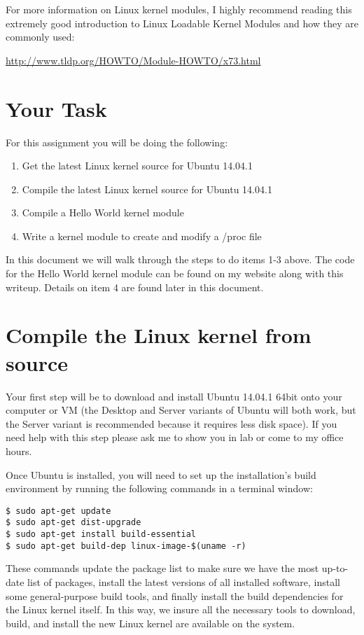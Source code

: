 \documentclass[11pt]{article}
\begin{document}
For more information on Linux kernel modules, I highly recommend reading this extremely good introduction to Linux Loadable Kernel Modules and how they are commonly used:

{\url{http://www.tldp.org/HOWTO/Module-HOWTO/x73.html}}


\section*{Your Task}

For this assignment you will be doing the following:

\begin{enumerate}
\item{Get the latest Linux kernel source for Ubuntu 14.04.1}
\item{Compile the latest Linux kernel source for Ubuntu 14.04.1}
\item{Compile a Hello World kernel module}
\item{Write a kernel module to create and modify a /proc file}
\end{enumerate}

In this document we will walk through the steps to do items 1-3 above. The code for the Hello World kernel module can be found on my website along with this writeup. Details on item 4 are found later in this document. 



\section*{Compile the Linux kernel from source}
Your first step will be to download and install Ubuntu 14.04.1 64bit \cite{ubuntuserver} onto your computer or VM (the Desktop and Server variants of Ubuntu will both work, but the Server variant is recommended because it requires less disk space). If you need help with this step please ask me to show you in lab or come to my office hours.

Once Ubuntu is installed, you will need to set up the installation's build environment by running the following commands in a terminal window:

\begin{verbatim}
$ sudo apt-get update
$ sudo apt-get dist-upgrade
$ sudo apt-get install build-essential
$ sudo apt-get build-dep linux-image-$(uname -r)
\end{verbatim}

These commands update the package list to make sure we have the most up-to-date list of packages, install the latest versions of all installed software, install some general-purpose build tools, and finally install the build dependencies for the Linux kernel itself. In this way, we insure all the necessary tools to download, build, and install the new Linux kernel are available on the system.
\end{document}
